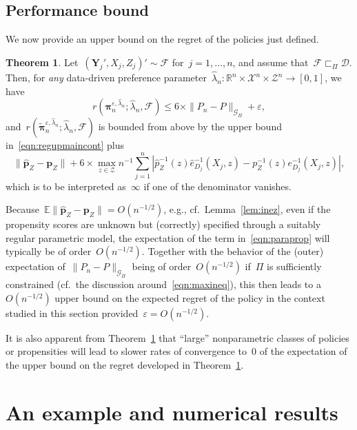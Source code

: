 \documentclass[11pt, a4paper]{article}
\newcommand{\R}{\mathbb{R}}
\newcommand\E{\mathbb{E}}
\theoremstyle{definition}
\newtheorem{theorem}{Theorem}[section]
\begin{document}
\subsection{Performance bound}

We now provide an upper bound on the regret of  the policies just defined.
%
\begin{theorem}\label{thm:upregcont}
Let~$(\bm{Y}_j', X_j, Z_j)' \sim \mathcal{F}$ for~$j =1, \hdots, n$, and assume that~$\mathcal{F} \sqsubset_{\Pi} \mathscr{D}$. Then, for \emph{any} data-driven preference parameter~$  \hat{\lambda}_n: \R^n \times \mathcal{X}^n \times \mathcal{Z}^n \to [0, 1]$, we have
\begin{equation}\label{eqn:regupmaincont}
r(\bm{\pi}^{\varepsilon,   \hat{\lambda}_n}_n;   \hat{\lambda}_n, \mathcal{F}) \leq 6 \times \|P_n - P\|_{\mathcal{G}_{\Pi}} + \varepsilon,
\end{equation}  
and~$r(\tilde{\bm{\pi}}^{\varepsilon,   \hat{\lambda}_n}_n;   \hat{\lambda}_n, \mathcal{F})$ is bounded from above by the upper bound in~\eqref{eqn:regupmaincont} plus
\begin{equation}\label{eqn:paraprop}
\|\hat{\bm{p}}_Z - \bm{p}_Z \| + 6 \times \max_{z \in \mathcal{Z}} n^{-1}  \sum_{j = 1}^n  \left |\hat{p}^{-1}_Z(z)\hat{e}^{-1}_{D_j}(X_j, 
z) - p^{-1}_Z(z) e^{-1}_{D_j}(X_j, 
z) \right|,
\end{equation}
which is to be interpreted as~$\infty$ if one of the denominator vanishes.
\end{theorem}
%
Because~$\E \|\hat{\bm{p}}_Z - \bm{p}_Z \| = O(n^{-1/2})$, e.g., cf.~Lemma~\ref{lem:inez}, even if the propensity scores are unknown but (correctly) specified through a suitably regular parametric model, the expectation of the term in~\eqref{eqn:paraprop} will typically be of order~$O(n^{-1/2})$. Together with the behavior of the (outer) expectation of~$ \| P_n - P \|_{\mathcal{G}_{\Pi}}$ being of order~$O(n^{-1/2})$ if~$\Pi$ is sufficiently constrained (cf.~the discussion around~\eqref{eqn:maxineq}), this then leads to a~$O(n^{-1/2})$ upper bound on the expected regret of the policy in the context studied in this section provided~$\varepsilon = O(n^{-1/2})$. 

It is also apparent from Theorem~\ref{thm:upregcont} that ``large'' nonparametric classes of policies or propensities will lead to slower rates of convergence to~$0$ of the expectation of the upper bound on the regret developed in Theorem~\ref{thm:upregcont}. 


\section{An example and numerical results}\label{sec:numex}
\end{document}
